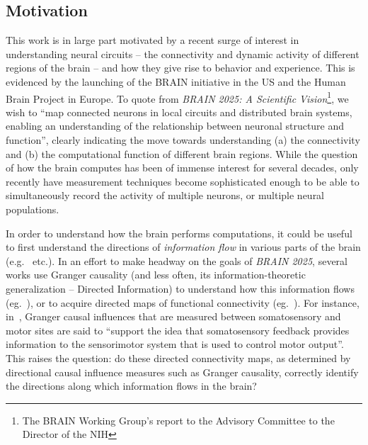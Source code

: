 \documentclass[letterpaper, 10pt, conference]{ieeeconf}
\begin{document}
\subsection{Motivation}
\label{sec:motivation}

This work is in large part motivated by a recent surge of interest in understanding neural circuits -- the connectivity and dynamic activity of different regions of the brain -- and how they give rise to behavior and experience. This is evidenced by the launching of the BRAIN initiative in the US and the Human Brain Project in Europe. To quote from \emph{BRAIN 2025: A Scientific Vision}\footnote{The BRAIN Working Group's report to the Advisory Committee to the Director of the NIH}, we wish to ``map connected neurons in local circuits and distributed brain systems, enabling an understanding of the relationship between neuronal structure and function'', clearly indicating the move towards understanding (a) the connectivity and (b) the computational function of different brain regions. While the question of how the brain computes has been of immense interest for several decades, only recently have measurement techniques become sophisticated enough to be able to simultaneously record the activity of multiple neurons, or multiple neural populations.

In order to understand how the brain performs computations, it could be useful to first understand the directions of \emph{information flow} in various parts of the brain (e.g.~\cite{blinowska2004granger,dhamala2008analyzing,nolte2008robustly,korzeniewska2003determination,schippers2010mapping} etc.). In an effort to make headway on the goals of \emph{BRAIN 2025}, several works use Granger causality (and less often, its information-theoretic generalization -- Directed Information) to understand how this information flows (eg.~\cite{Brovelli2004BetaOscillations,goebel2003investigating,deshpande2008effective}), or to acquire directed maps of functional connectivity (eg.~\cite{friston2013analysing,goebel2003investigating,deshpande2008effective}). For instance, in~\cite{Brovelli2004BetaOscillations}, Granger causal influences that are measured between somatosensory and motor sites are said to ``support the idea that somatosensory feedback provides information to the sensorimotor system that is used to control motor output''. This raises the question: do these directed connectivity maps, as determined by directional causal influence measures such as Granger causality, correctly identify the directions along which information flows in the brain?
\end{document}
